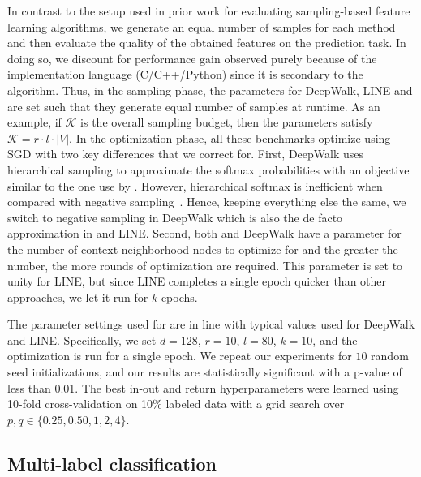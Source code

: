 In contrast to the setup used in prior work for evaluating sampling-based feature learning algorithms, we generate an equal number of samples for each method and then evaluate the quality of the obtained features on the prediction task. In doing so, we discount for performance gain observed purely because of the implementation language (C/C++/Python) since it is secondary to the algorithm.
%
Thus, in the sampling phase, the parameters for DeepWalk, LINE and \nodevec are set such that they generate equal number of samples at runtime. As an example, if $\mathcal{K}$ is the overall sampling budget, then the \nodevec parameters satisfy $\mathcal{K}=r\cdot l \cdot |V|$. In the optimization phase, all these benchmarks optimize using SGD with two key differences that we correct for. First, DeepWalk uses hierarchical sampling to approximate the softmax probabilities with an objective similar to the one use by \nodevec. However, hierarchical softmax is inefficient when compared with negative sampling~\cite{word2vec2}. Hence, keeping everything else the same, we switch to negative sampling in DeepWalk which is also the de facto approximation in \nodevec and LINE. Second, both \nodevec and DeepWalk have a parameter for the number of context neighborhood nodes to optimize for and the greater the number, the more rounds of optimization are required. This parameter is set to unity for LINE, but since LINE completes a single epoch quicker than other approaches, we let it run for $k$ epochs.

The parameter settings used for \nodevec are in line with typical values used for DeepWalk and LINE. Specifically, we set $d=128$, $r=10$, $l=80$, $k=10$, and the optimization is run for a single epoch. We repeat our experiments for $10$ random seed initializations, and our results are statistically significant with a p-value of less than 0.01.%
The best in-out and return hyperparameters were learned using 10-fold cross-validation on 10\% labeled data with a grid search over $p, q \in \{0.25, 0.50, 1, 2, 4 \}$. 

\subsection{Multi-label classification}

